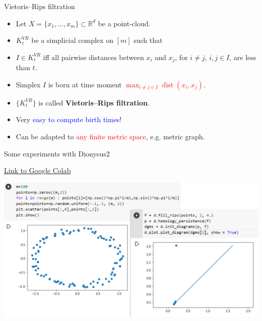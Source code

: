 \documentclass[10pt,xcolor={usenames}]{beamer}
\DeclareMathOperator{\dist}{dist}
\newcommand{\Ro}{\mathbb{R}}
\begin{document}
\begin{frame}{Vietoris--Rips filtration}

\begin{itemize}
  \item Let $X=\{x_1,\ldots,x_m\}\subset \Ro^d$ be a point-cloud.\pause
  \item $K^{VR}_t$ be a simplicial complex on $[m]$ such that
  \item $I\in K^{VR}_t$ iff all pairwise distances between $x_i$ and $x_j$, for $i\neq j$, $i,j\in I$, are less than $t$.
  \item Simplex $I$ is born at time moment \textcolor{red}{$\max_{i\neq j\in I}\dist(x_i,x_j)$}.\pause
  \item $\{K^{VR}_t\}$ is called \textbf{Vietoris--Rips filtration}.\pause
  \item Very \textcolor{blue}{easy to compute birth times}!\pause
  \item Can be adapted to  \textcolor{red}{any finite metric space}, e.g. metric graph.
\end{itemize}

\end{frame}

\begin{frame}{Some experiments with Dionysus2}

\href{https://colab.research.google.com/drive/146yQdZBsPGfYZwi1AGKJwSE5wjRwPnc1?usp=sharing}{Link to Google Colab}

\begin{center}
\includegraphics[scale = 0.2]{pictures/pythonComb.png}
\end{center}

\end{frame}
\end{document}
